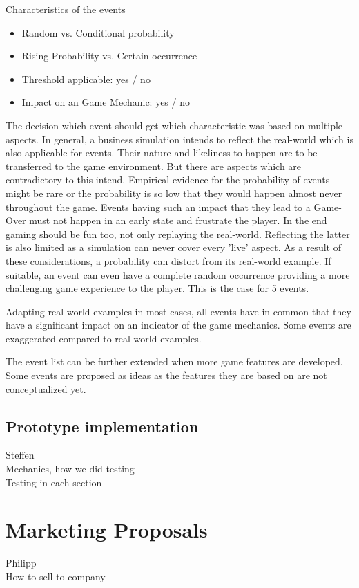 \documentclass[11pt,titlepage,oneside,openany]{book}
\begin{document}
Characteristics of the events
\begin{itemize}
\item Random vs. Conditional probability
\item Rising Probability vs. Certain occurrence
\item Threshold applicable: yes / no
\item Impact on an Game Mechanic: yes / no
\end{itemize}
The decision which event should get which characteristic was based on multiple aspects. In general, a business simulation intends to reflect the real-world which is also applicable for events. Their nature and likeliness to happen are to be transferred to the game environment. But there are aspects which are contradictory to this intend. Empirical evidence for the probability of events might be rare or the probability is so low that they would happen almost never throughout the game. Events having such an impact that they lead to a Game-Over must not happen in an early state and frustrate the player. In the end gaming should be fun too, not only replaying the real-world. Reflecting the latter is also limited as a simulation can never cover every 'live' aspect. As a result of these considerations, a probability can distort from its real-world example. If suitable, an event can even have a complete random occurrence providing a more challenging game experience to the player. This is the case for 5 events. 



Adapting real-world examples in most cases, all events have in common that they have a significant impact on an indicator of the game mechanics. Some events are exaggerated compared to real-world examples. 

The event list can be further extended when more game features are developed. Some events are proposed as ideas as the features they are based on are not conceptualized yet.
\section{Prototype implementation}
Steffen\\
Mechanics, how we did testing\\
Testing in each section

\chapter{Marketing Proposals}
Philipp\\
\label{cha:exp}
\label{sec:setting}
How to sell to company
\end{document}
